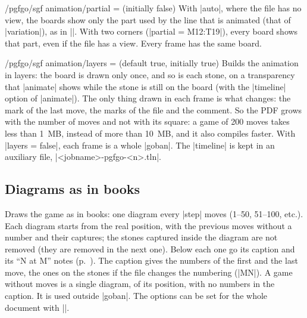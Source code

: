 \begin{key}{/pgfgo/sgf animation/partial =  (initially false)}
	With |auto|, where the file has no view, the boards show only the part used by the line that is animated (that of |variation|), as in |\sgfdiagrams|. With two corners (|partial = M12:T19|), every board shows that part, even if the file has a view. Every frame has the same board.
\end{key}

\begin{key}{/pgfgo/sgf animation/layers =  (default true, initially true)}
	Builds the animation in layers: the board is drawn only once, and so is each stone, on a transparency that |animate| shows while the stone is still on the board (with the |timeline| option of |animate|). The only thing drawn in each frame is what changes: the mark of the last move, the marks of the file and the comment. So the PDF grows with the number of moves and not with its square: a game of 200 moves takes less than 1~MB, instead of more than 10~MB, and it also compiles faster. With |layers = false|, each frame is a whole |goban|. The |timeline| is kept in an auxiliary file, |<jobname>-pgfgo-<n>.tln|.
\end{key}

\subsection{Diagrams as in books}
\label{subsec:sgfdiagramas}

\begin{command}{\sgfdiagrams{}}
	Draws the game as in books: one diagram every |step| moves (1--50, 51--100, etc.). Each diagram starts from the real position, with the previous moves without a number and their captures; the stones captured inside the diagram are not removed (they are removed in the next one). Below each one go its caption and its ``N at M'' notes (p.~\pageref{subsec:notas}). The caption gives the numbers of the first and the last move, the ones on the stones if the file changes the numbering (|MN|). A game without moves is a single diagram, of its position, with no numbers in the caption. It is used outside |goban|. The options can be set for the whole document with ||.

	\begin{codeexample}
	\end{codeexample}
\end{command}

